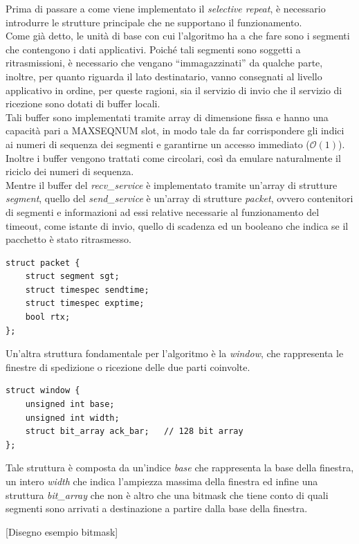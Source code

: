 Prima di passare a come viene implementato il \emph{selective repeat}, è 
necessario introdurre le strutture principale che ne supportano il 
funzionamento.\\
Come già detto, le unità di base con cui l'algoritmo ha a che fare sono
i segmenti che contengono i dati applicativi. Poiché tali segmenti sono
soggetti a ritrasmissioni, è necessario che vengano ``immagazzinati'' da 
qualche parte, inoltre, per quanto riguarda il lato destinatario, vanno
consegnati al livello applicativo in ordine, per queste ragioni, sia il 
servizio di invio che il servizio di ricezione sono dotati di buffer locali.\\
Tali buffer sono implementati tramite array di dimensione fissa e hanno una
capacità pari a MAXSEQNUM slot, in modo tale da far
corrispondere gli indici ai numeri di sequenza dei segmenti e 
garantirne un accesso immediato ($\mathcal{O}(1)$). Inoltre i buffer vengono
trattati come circolari, così da emulare naturalmente il riciclo dei numeri 
di sequenza.\\
Mentre il buffer del \emph{recv\_service} è implementato tramite un'array di 
strutture \emph{segment}, quello del \emph{send\_service} è un'array di 
strutture \emph{packet}, ovvero contenitori di segmenti e informazioni ad essi
relative necessarie al funzionamento del timeout, come istante di invio, quello
di scadenza ed un booleano che indica se il pacchetto è stato ritrasmesso.

\begin{lstlisting}[title=transport.h]
struct packet {
	struct segment sgt;
	struct timespec sendtime;
	struct timespec exptime;
	bool rtx;
};
\end{lstlisting}

Un'altra struttura fondamentale per l'algoritmo è la \emph{window}, che 
rappresenta le finestre di spedizione o ricezione delle due parti 
coinvolte.
\begin{lstlisting}[title=window.h]
struct window {
	unsigned int base;
	unsigned int width;
	struct bit_array ack_bar;	// 128 bit array
};
\end{lstlisting}
Tale struttura è composta da un'indice \emph{base} che rappresenta la base
della finestra, un intero \emph{width} che indica l'ampiezza massima della
finestra ed infine una struttura \emph{bit\_array} che non è altro che una
bitmask che tiene conto di quali segmenti sono arrivati a destinazione a 
partire dalla base della finestra.

[Disegno esempio bitmask] 

